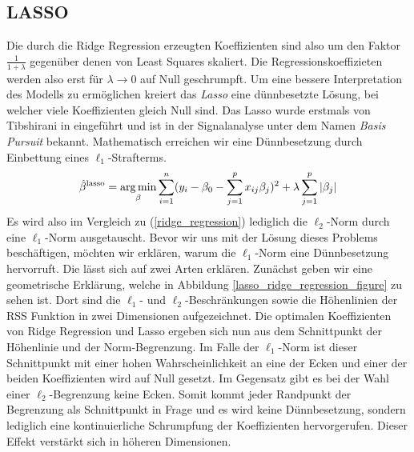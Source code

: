 \subsection{LASSO}

Die durch die Ridge Regression erzeugten Koeffizienten sind also um den Faktor $\frac{1}{1+\lambda}$ gegenüber denen von Least Squares skaliert. Die Regressionskoeffizieten werden also erst für $\lambda \rightarrow 0$ auf Null geschrumpft. Um eine bessere Interpretation des Modells zu ermöglichen kreiert das \textit{Lasso} eine dünnbesetzte Lösung, bei welcher viele Koeffizienten gleich Null sind. Das Lasso wurde erstmals von Tibshirani in \cite{tibshirani_lasso} eingeführt und ist in der Signalanalyse unter dem Namen \textit{Basis Pursuit} \cite{chen} bekannt. Mathematisch erreichen wir eine Dünnbesetzung durch Einbettung eines $\ell_1$-Strafterms.
\begin{align}
\label{lasso}
\hat{\beta}^{\text{lasso}} = \operatorname*{arg\,min}_{\beta} \sum_{i=1}^{n}(y_i - \beta_0 - \sum_{j=1}^p x_{ij}\beta_j)^2 + \lambda\sum_{j=1}^p \left|\beta_j\right|
\end{align}
Es wird also im Vergleich zu (\ref{ridge_regression}) lediglich die $\ell_2$-Norm durch eine $\ell_1$-Norm ausgetauscht. Bevor wir uns mit der Lösung dieses Problems beschäftigen, möchten wir erklären, warum die $\ell_1$-Norm eine Dünnbesetzung hervorruft. Die lässt sich auf zwei Arten erklären. Zunächst geben wir eine geometrische Erklärung, welche in Abbildung \ref{lasso_ridge_regression_figure} zu sehen ist. Dort sind die $\ell_1$- und $\ell_2$-Beschränkungen sowie die Höhenlinien der RSS Funktion in zwei Dimensionen aufgezeichnet. Die optimalen Koeffizienten von Ridge Regression und Lasso ergeben sich nun aus dem Schnittpunkt der Höhenlinie und der Norm-Begrenzung. Im Falle der $\ell_1$-Norm ist dieser Schnittpunkt mit einer hohen Wahrscheinlichkeit an eine der Ecken und einer der beiden Koeffizienten wird auf Null gesetzt. Im Gegensatz gibt es bei der Wahl einer $\ell_2$-Begrenzung keine Ecken. Somit kommt jeder Randpunkt der Begrenzung als Schnittpunkt in Frage und es wird keine Dünnbesetzung, sondern lediglich eine kontinuierliche Schrumpfung der Koeffizienten hervorgerufen. Dieser Effekt verstärkt sich in höheren Dimensionen.

